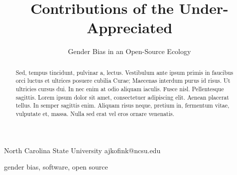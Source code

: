 \documentclass{sigplanconf}
\begin{document}
\setlength{\pdfpageheight}{\paperheight}
\setlength{\pdfpagewidth}{\paperwidth}






\title{Contributions of the Under-Appreciated}
\subtitle{Gender Bias in an Open-Source Ecology}

           {North Carolina State University}
           {ajkofink@ncsu.edu}

\maketitle

\begin{abstract}
Sed, tempus tincidunt, pulvinar a, lectus. Vestibulum ante ipsum primis in
faucibus orci luctus et ultrices posuere cubilia Curae; Maecenas interdum purus
id risus. Ut ultricies cursus dui. In nec enim at odio aliquam iaculis. Fusce
nisl. Pellentesque sagittis. Lorem ipsum dolor sit amet, consectetuer adipiscing
elit. Aenean placerat tellus. In semper sagittis enim. Aliquam risus neque,
pretium in, fermentum vitae, vulputate et, massa. Nulla sed erat vel eros ornare
venenatis.
\end{abstract}



\keywords
gender bias, software, open source
\end{document}
